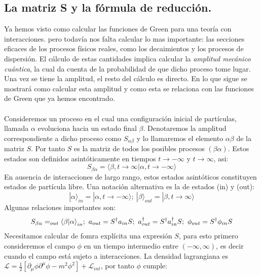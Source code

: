 \subsection{La matriz S y la fórmula de reducción.}
Ya hemos visto como calcular las funciones de Green para una teoría con interacciones. pero todavía nos falta calcular lo mas importante: las secciones eficaces de los procesos físicos reales, como los decaimientos y los procesos de dispersión. El cálculo de estas cantidades implica calcular la \textit{amplitud mecánico cuántica}, la cual da cuenta de la probabilidad de que dicho proceso tome lugar. Una vez se tiene la amplitud, el resto del cálculo es directo. En lo que sigue se mostrará como calcular esta amplitud y como esta se relaciona con las funciones de Green que ya hemos encontrado.
\\
\\
Consideremos un proceso en el cual una configuración inicial de partículas, llamada $\alpha$ evoluciona hacia un estado final $\beta$. Denotaremos la amplitud correspondiente a dicho proceso como $S_{\alpha\beta}$ y lo llamaremos el elemento $\alpha\beta$ de la matriz $S$. Por tanto $S$ es la matriz de todos los posibles procesos $(\beta\alpha)$. Estos estados son definidos asintóticamente en tiempos $t\to -\infty$ y $t\to \infty$, asi:
\begin{equation}
S_{\beta\alpha}=\langle \beta,t\to\infty|\alpha,t\to -\infty\rangle
\end{equation} 
En ausencia de interacciones de largo rango, estos estados asintóticos constituyen estados de partícula libre. Una notación alternativa es la de estados (in) y (out):
\begin{equation}
|\alpha\rangle_{in}=|\alpha,t\to-\infty\rangle;\ |\beta\rangle_{out}=|\beta,t\to\infty\rangle
\end{equation}
Algunas relaciones importantes son:
\begin{equation}
S_{\beta\alpha}=_{out}\langle\beta|\alpha\text{\ensuremath{\rangle}}_{in};\ a_{out}=S^{\dagger}a_{in}S;\ a_{out}^{\dagger}=S^{\dagger}a_{in}^{\text{\ensuremath{\dagger}}}S;\ \phi_{out}=S^{\dagger}\phi_{in}S
\end{equation}
Necesitamos calcular de fomra explícita una expresión $S$, para esto primero consideremos el campo $\phi$ en un tiempo intermedio entre $(-\infty,\infty)$, es decir cuando el campo está sujeto a interacciones. La densidad lagrangiana es $\mathcal{L}=\frac{1}{2}\left[\partial_{\mu}\phi\partial^{\mu}\phi-m^{2}\phi^{2}\right]+\mathcal{L}_{int}$, por tanto $\phi$ cumple:
